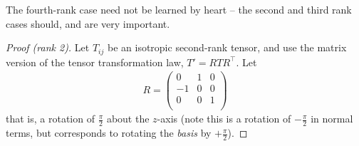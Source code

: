 \documentclass{../../template/note}
\begin{document}
    The fourth-rank case need not be learned by heart -- the second and third rank cases should, and are very important.

    \begin{proof}[Proof (rank 2)]
        Let \(T_{ij}\) be an isotropic second-rank tensor, and use the matrix version of the tensor transformation law, \(T' = RTR^\intercal\). Let
        \begin{align*}
            R = \begin{pmatrix}
                0 & 1 & 0 \\
                -1 & 0 & 0 \\
                0 & 0 & 1 \\
            \end{pmatrix}
        \end{align*}
        that is, a rotation of \(\frac{\pi}2\) about the \(z\)-axis (note this is a rotation of \(-\frac{\pi}2\) in normal terms, but corresponds to rotating the \emph{basis} by \(+\frac{\pi}2\)).
    


\end{proof}
\end{document}
